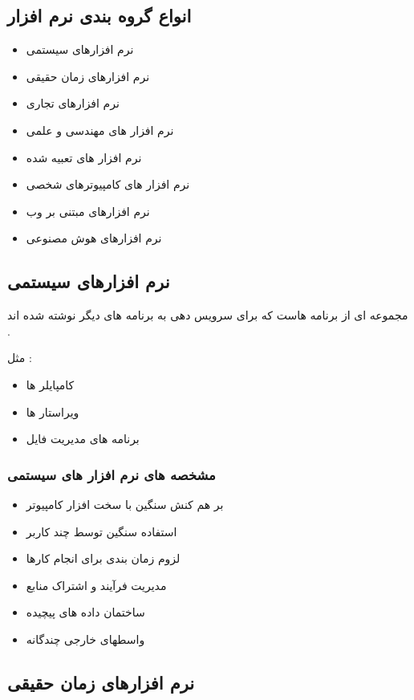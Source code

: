 \documentclass{article}
\begin{document}
\subsection{انواع گروه بندی نرم افزار}

\begin{itemize}
	\item نرم افزارهای سیستمی
	\item نرم افزارهای زمان حقیقی
	\item نرم افزارهای تجاری
	\item نرم افزار های مهندسی و علمی
	\item نرم افزار های تعبیه شده
	\item نرم افزار های کامپیوترهای شخصی
	\item نرم افزارهای مبتنی بر وب
	\item نرم افزارهای هوش مصنوعی
\end{itemize}

\newpage

\subsection{نرم افزارهای سیستمی}
مجموعه ای از برنامه هاست که برای سرویس دهی به برنامه های دیگر نوشته شده اند .

 مثل : 
\begin{itemize}
	\item کامپایلر ها
	\item ویراستار ها
	\item برنامه های مدیریت فایل
\end{itemize}


\subsubsection{مشخصه های نرم افزار های سیستمی}

\begin{itemize}
	\item بر هم کنش سنگین با سخت افزار کامپیوتر
	\item استفاده سنگین توسط چند کاربر
	\item لزوم زمان بندی برای انجام کارها
	\item مدیریت فرآیند و اشتراک منابع
	\item ساختمان داده های پیچیده
	\item واسطهای خارجی چندگانه
\end{itemize}



\subsection{نرم افزارهای زمان حقیقی}
\end{document}
